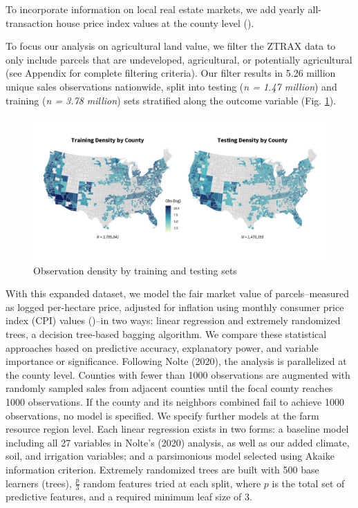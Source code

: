 \documentclass[12pt]{article}
\begin{document}
To incorporate information on local real estate markets, we add yearly all-transaction house price index values at the county level (\cite{FederalHousing2022}).

To focus our analysis on agricultural land value, we filter the ZTRAX data to only include parcels that are undeveloped, agricultural, or potentially agricultural (see Appendix for complete filtering criteria).
Our filter results in 5.26 million unique sales observations nationwide, split into testing (\textit{n = 1.47 million}) and training (\textit{n = 3.78 million}) sets stratified along the outcome variable (Fig. \ref{fig:train_test}).

\begin{figure}
    \centering
    \includegraphics[width=6in]{figures/test_train_density.png}
    \caption{Observation density by training and testing sets}
    \label{fig:train_test}
\end{figure}

With this expanded dataset, we model the fair market value of parcels--measured as logged per-hectare price, adjusted for inflation using monthly consumer price index (CPI) values (\cite{blsConsumerPrice})--in two ways: linear regression and extremely randomized trees, a decision tree-based bagging algorithm. We compare these statistical approaches based on predictive accuracy, explanatory power, and variable importance or significance. Following Nolte (2020), the analysis is parallelized at the county level. Counties with fewer than 1000 observations are augmented with randomly sampled sales from adjacent counties until the focal county reaches 1000 observations. If the county and its neighbors combined fail to achieve 1000 observations, no model is specified. We specify further models at the farm resource region level. Each linear regression exists in two forms: a baseline model including all 27 variables in Nolte's (2020) analysis, as well as our added climate, soil, and irrigation variables; and a parsimonious model selected using Akaike information criterion. Extremely randomized trees are built with 500 base learners (trees), $\frac{p}{3}$ random features tried at each split, where $p$ is the total set of predictive features, and a required minimum leaf size of 3.
\end{document}
